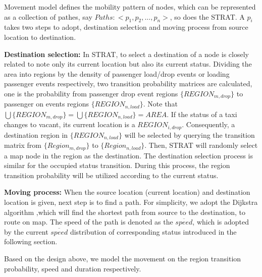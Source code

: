 
Movement model defines the mobility pattern of nodes, which can be represented as a collection of pathes, say $Paths:<p_1,p_2,...,p_n>$, so does the STRAT. A $p_i$ takes two steps to adopt, destination selection and moving process from source location to destination.

\textbf{Destination selection:} In STRAT, to select a destination of a node is closely related to note only its current location but also its current status. Dividing the area into regions by the density of passenger load/drop events or loading passenger events respectively, two transition probability matrices are calculated, one is the probability from passenger drop event regions $\{REGION_{m,drop}\}$ to passenger on events regions $\{REGION_{n,load}\}$. Note that $\bigcup\{REGION_{m,drop}\}=\bigcup\{REGION_{n,load}\}=AREA$. If the status of a taxi changes to vacant, its current location is a $REGION_{i,drop}$. Consequently, a destination region in $\{REGION_{n,load}\}$ will be selected by querying the transition matrix from $\{Region_{m,drop}\}$ to $\{Region_{n,load}\}$. Then, STRAT will randomly select a map node in the region as the destination. The destination selection process is similar for the occupied status transition. During this process, the region transition probability will be utilized according to the current status.

\textbf{Moving process:} When the source location (current location) and destination location is given, next step is to find a path. For simplicity, we adopt the Dijkstra algorithm ,which will find the shortest path from source to the destination, to route on map. The speed of the path is denoted as the $\overline{speed}$, which is adopted by the current $\overline{speed}$  distribution of corresponding status introduced in the following section.

Based on the design above, we model the movement on the region transition probability, speed and duration respectively.



